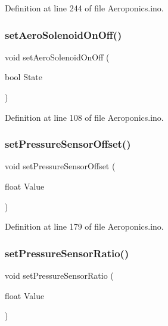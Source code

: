 Definition at line 244 of file Aeroponics.\+ino.

\mbox{\label{_aeroponics_8ino_ad61360e89f656048b86e1e6ea838755a}} 
\subsubsection{\texorpdfstring{setAeroSolenoidOnOff()}{setAeroSolenoidOnOff()}}
{\footnotesize\ttfamily void set\+Aero\+Solenoid\+On\+Off (\begin{DoxyParamCaption}\item[{bool}]{State }\end{DoxyParamCaption})}



Definition at line 108 of file Aeroponics.\+ino.

\mbox{\label{_aeroponics_8ino_a0472e5352826e59a5c7dfa412ed359df}} 
\subsubsection{\texorpdfstring{setPressureSensorOffset()}{setPressureSensorOffset()}}
{\footnotesize\ttfamily void set\+Pressure\+Sensor\+Offset (\begin{DoxyParamCaption}\item[{float}]{Value }\end{DoxyParamCaption})}



Definition at line 179 of file Aeroponics.\+ino.

\mbox{\label{_aeroponics_8ino_a76c21e0dba5014e2f2cdb5739690170a}} 
\subsubsection{\texorpdfstring{setPressureSensorRatio()}{setPressureSensorRatio()}}
{\footnotesize\ttfamily void set\+Pressure\+Sensor\+Ratio (\begin{DoxyParamCaption}\item[{float}]{Value }\end{DoxyParamCaption})}



